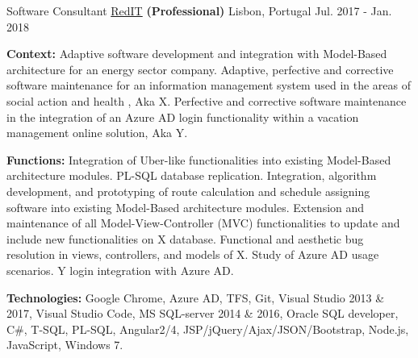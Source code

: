 \begin{cventries}
  \cventry
    {Software Consultant} %
    {\href{https://www.reditpro.com/}{RedIT} \textbf{(Professional)}} %
    {Lisbon, Portugal} %
    {Jul. 2017 - Jan. 2018} 
    {
      \begin{cvitems} %
		\item[] {\textbf{Context:} 
Adaptive software development and integration with Model-Based architecture for an energy sector company. %
Adaptive, perfective and corrective software maintenance for an information management system used in the areas of social action and health%
, Aka X.
Perfective and corrective software maintenance in the integration of an Azure AD login functionality within a vacation management online solution, Aka Y.}
		\item[] {\textbf{Functions:} Integration of Uber-like functionalities into existing Model-Based architecture modules. PL-SQL database replication. Integration, algorithm development, and prototyping of route calculation and schedule assigning software into existing Model-Based architecture modules.
		Extension and maintenance of all Model-View-Controller (MVC) functionalities to update and include new functionalities on X database. Functional and aesthetic bug resolution in views, controllers, and models of X.
		Study of Azure AD usage scenarios. Y login integration with Azure AD.}		
		\item[] {\textbf{Technologies:} 
		\textcolor{rainbowcolor-olive}{Google Chrome}, 
		\textcolor{rainbowcolor-olive}{Azure AD}, 
		\textcolor{rainbowcolor-olive}{TFS}, 
		\textcolor{rainbowcolor-olive}{Git}, 
		\textcolor{rainbowcolor-olive}{Visual Studio 2013 \& 2017},
		\textcolor{rainbowcolor-olive}{Visual Studio Code}, 
		\textcolor{rainbowcolor-olive}{MS SQL-server 2014 \& 2016},
		\textcolor{rainbowcolor-olive}{Oracle SQL developer},
		\textcolor{rainbowcolor-indigo}{C\#}, 
		\textcolor{rainbowcolor-indigo}{T-SQL},
		\textcolor{rainbowcolor-indigo}{PL-SQL}, 
		\textcolor{rainbowcolor-indigo}{Angular2/4}, 
		\textcolor{rainbowcolor-indigo}{JSP/jQuery/Ajax/JSON/Bootstrap},
		\textcolor{rainbowcolor-indigo}{Node.js}, 
		\textcolor{rainbowcolor-indigo}{JavaScript}, 
		\textcolor{rainbowcolor-orange}{Windows 7}.}	
      \end{cvitems}
    } 
    

\end{cventries}
